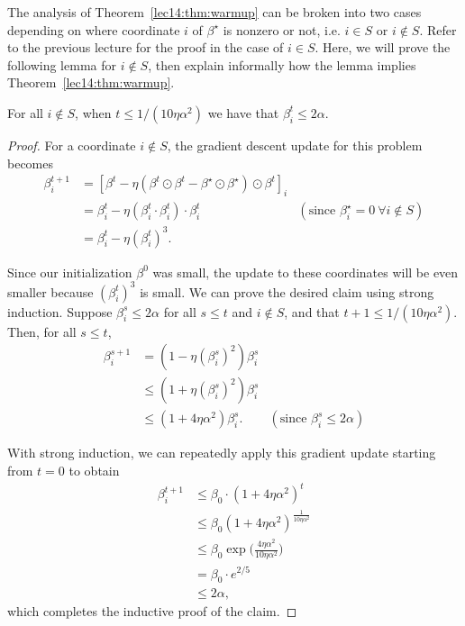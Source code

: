 The analysis of Theorem~\ref{lec14:thm:warmup} can be broken into two cases depending on where coordinate $i$ of $\beta^\star$ is nonzero or not, i.e. $i \in S$ or $i \notin S$. Refer to the previous lecture for the proof in the case of $i \in S$. Here, we will prove the following lemma for $i \notin S$, then explain informally how the lemma implies Theorem~\ref{lec14:thm:warmup}.

\begin{lemma}
For all $i \notin S$, when $t \leq 1 / (10 \eta \alpha^{2})$ we have that $\beta_{i}^{t} \leq 2\alpha$.
\end{lemma}

\begin{proof}
For a coordinate $i\notin S$, the gradient descent update for this problem becomes
\begin{align}
    \beta_i^{t+1} &= \left[ \beta^{t} - \eta (\beta^{t} \odot \beta^{t} - \beta^\star \odot \beta^\star) \odot \beta^{t} \right]_i \\
    &= \beta_i^{t} - \eta (\beta_i^{t} \cdot \beta_i^{t}) \cdot \beta_i^{t} & (\text{since } \beta_{i}^\star = 0 \ \forall i \notin S) \\
    &= \beta_i^{t} - \eta (\beta_i^{t})^{3}.
\end{align}

Since our initialization $\beta^{0}$ was small, the update to these coordinates will be even smaller because $(\beta_{i}^{t})^{3}$ is small. We can prove the desired claim using strong induction. Suppose $\beta_{i}^{s} \leq 2\alpha$ for all $s \leq t$ and $i \notin S$, and that $t+1 \leq 1 / (10\eta \alpha^{2})$. Then, for all $s \leq t$,
\begin{align}
\beta_{i}^{s+1} %
    &= (1 - \eta (\beta_{i}^{s})^{2})\beta_{i}^{s} \\
    &\leq (1 + \eta (\beta_{i}^{s})^{2}) \beta_{i}^{s} \\
    &\leq (1 + 4\eta \alpha^{2}) \beta_{i}^{s}. & (\text{since } \beta_{i}^{s} \leq 2\alpha)
\end{align}

With strong induction, we can repeatedly apply this gradient update starting from $t=0$ to obtain
\begin{align}
    \beta_{i}^{t+1} &\leq \beta_{0} \cdot (1 + 4 \eta \alpha^{2})^t \\
    &\leq \beta_{0} ( 1 + 4 \eta \alpha^{2})^{\frac{1}{10 \eta \alpha^{2} }} \\
    &\leq \beta_{0} \exp \bigg(\frac{4\eta \alpha^{2}}{10 \eta \alpha^{2}} \bigg) \\
    &=  \beta_{0} \cdot e^{2/5} \\
    &\leq 2 \alpha,
 \end{align}
 which completes the inductive proof of the claim.

\end{proof}

